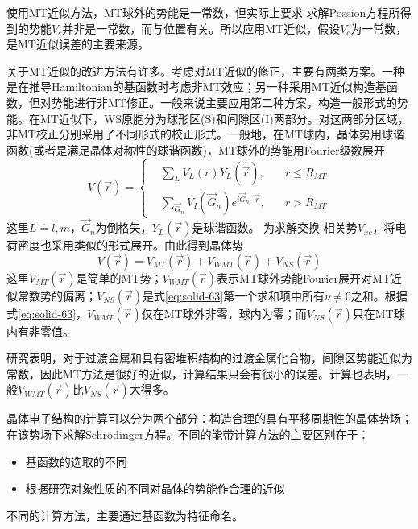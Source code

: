 使用MT近似方法，MT球外的势能是一常数，但实际上要求%
求解Possion方程所得到的势能$V_c$并非是一常数，而与位置有关。所以应用MT近似，假设$V_c$为一常数，是MT近似误差的主要来源。

关于MT近似的改进方法有许多\cite{RPP44-139_1981}。考虑对MT近似的修正，主要有两类方案。一种是在推导Hamiltonian的基函数时考虑非MT效应；另一种采用MT近似构造基函数，但对势能进行非MT修正。一般来说主要应用第二种方案，构造一般形式的势能。在MT近似下，WS原胞分为球形区(S)和间隙区(I)两部分。对这两部分区域，非MT校正分别采用了不同形式的校正形式。一般地，在MT球内，晶体势用球谐函数(或者是满足晶体对称性的球谐函数)，MT球外的势能用Fourier级数展开\cite{PRB13-5362_1976}
\begin{equation}
  V(\vec r)=\left\{
  \begin{aligned}
    &\sum_LV_L(r)Y_L(\hat{\vec r}),\quad &r\leqslant R_{MT}\\
    &\sum_{\vec G_n}V_I(\vec G_n)e^{i\vec G_n\cdot\vec r},&r>R_{MT}
  \end{aligned}\right.
  \label{eq:solid-63}
\end{equation}
这里$L\hat=l,m$，$\vec G_n$为倒格矢，$Y_L(\vec r)$是球谐函数。%
为求解交换-相关势$V_{xc}$，将电荷密度也采用类似的形式展开。由此得到晶体势
\begin{equation}
  V(\vec r)=V_{MT}(\vec r)+V_{WMT}(\vec r)+V_{NS}(\vec r)
  \label{eq:solid-64}
\end{equation}
这里$V_{MT}(\vec r)$是简单的MT势；$V_{WMT}(\vec r)$表示MT球外势能Fourier展开对MT近似常数势的偏离；$V_{NS}(\vec r)$是式\eqref{eq:solid-63}第一个求和项中所有$\nu$$\neq$0之和。根据式\eqref{eq:solid-63}，$V_{WMT}(\vec r)$仅在MT球外非零，球内为零；而$V_{NS}(\vec r)$只在MT球内有非零值。

研究表明，对于过渡金属和具有密堆积结构的过渡金属化合物，间隙区势能近似为常数，因此MT方法是很好的近似，计算结果只会有很小的误差\cite{PR153-931_1967,PRB1-1318_1970,PLA33-414_1970}。计算也表明，一般$V_{WMT}(\vec r)$比$V_{NS}(\vec r)$大得多。

晶体电子结构的计算可以分为两个部分：构造合理的具有平移周期性的晶体势场；在该势场下求解Schr\"odinger方程。不同的能带计算方法的主要区别在于：
\begin{itemize}
	\item 基函数的选取的不同
	\item 根据研究对象性质的不同对晶体的势能作合理的近似
\end{itemize}
不同的计算方法，主要通过基函数为特征命名。

